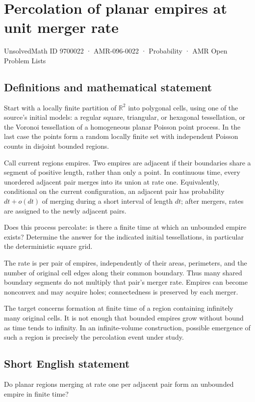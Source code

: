 \documentclass[11pt,a4paper]{article}
\begin{document}
\section*{Percolation of planar empires at unit merger rate}\label{9700022}
{\small UnsolvedMath ID 9700022 · AMR-096-0022 · Probability · AMR Open Problem Lists}
\subsection{Definitions and mathematical statement}
Start with a locally finite partition of $\mathbb R^2$ into polygonal cells, using one of the source's initial models: a regular square, triangular, or hexagonal tessellation, or the Voronoi tessellation of a homogeneous planar Poisson point process. In the last case the points form a random locally finite set with independent Poisson counts in disjoint bounded regions.

Call current regions empires. Two empires are adjacent if their boundaries share a segment of positive length, rather than only a point. In continuous time, every unordered adjacent pair merges into its union at rate one. Equivalently, conditional on the current configuration, an adjacent pair has probability $dt+o(dt)$ of merging during a short interval of length $dt$; after mergers, rates are assigned to the newly adjacent pairs.

Does this process percolate: is there a finite time at which an unbounded empire exists? Determine the answer for the indicated initial tessellations, in particular the deterministic square grid.

The rate is per pair of empires, independently of their areas, perimeters, and the number of original cell edges along their common boundary. Thus many shared boundary segments do not multiply that pair's merger rate. Empires can become nonconvex and may acquire holes; connectedness is preserved by each merger.

The target concerns formation at finite time of a region containing infinitely many original cells. It is not enough that bounded empires grow without bound as time tends to infinity. In an infinite-volume construction, possible emergence of such a region is precisely the percolation event under study.
\subsection{Short English statement}
Do planar regions merging at rate one per adjacent pair form an unbounded empire in finite time?
\end{document}
